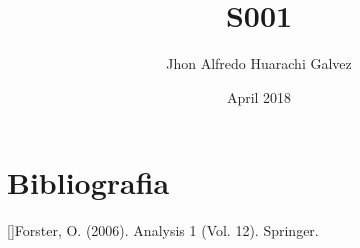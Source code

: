 \documentclass{article}
\title{S001}
\author{Jhon Alfredo Huarachi Galvez}
\date{April 2018}
\begin{document}
\maketitle

\section{Bibliografia}
[]Forster, O. (2006). Analysis 1 (Vol. 12). Springer.
\end{document}
